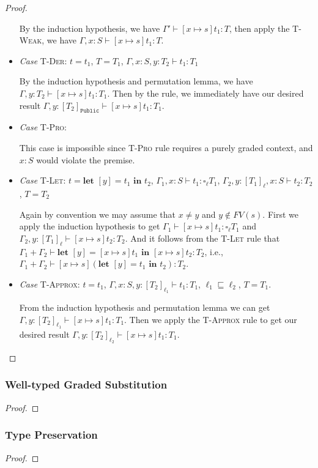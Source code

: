 \documentclass[conference]{IEEEtran}
\newcommand\unp[3]{\textbf{let }[#1]=#2\textbf{ in }#3}
\newcommand\gradedt[2]{\square_#1 #2}
\newcommand\public{\texttt{Public}}
\begin{document}
\begin{proof}
\begin{itemize}
		By the induction hypothesis, we have $\Gamma'\vdash [x\mapsto s]t_1:T$, then apply the \textsc{T-Weak}, we have $\Gamma,x:S\vdash [x\mapsto s]t_1:T$.
		
		\item\textit{Case} \textsc{T-Der}: $t=t_1$, $T=T_1$, $\Gamma,x:S,y:T_2\vdash t_1:T_1$
		
		By the induction hypothesis and permutation lemma, we have $\Gamma,y:T_2\vdash [x\mapsto s]t_1:T_1$. Then by the  rule, we immediately have our desired result $\Gamma,y:[T_2]_\public\vdash [x\mapsto s]t_1:T_1$.
		
		\item\textit{Case} \textsc{T-Pro}:
		
		This case is impossible since \textsc{T-Pro} rule requires a purely graded context, and $x:S$ would violate the premise.
		
		\item\textit{Case} \textsc{T-Let}: $t=\unp{y}{t_1}{t_2}$, $\Gamma_1,x:S\vdash t_1:\gradedt{\ell}{T_1}$, $\Gamma_2,y:[T_1]_\ell,x:S\vdash t_2:T_2$, $T=T_2$
		
		Again by convention we may assume that $x\ne y$ and $y\notin FV(s)$. First we apply the induction hypothesis to get $\Gamma_1\vdash [x\mapsto s]t_1:\gradedt{\ell}{T_1}$ and $\Gamma_2,y:[T_1]_\ell\vdash [x\mapsto s]t_2:T_2$. And it follows from the \textsc{T-Let} rule that $\Gamma_1+\Gamma_2\vdash\unp{y}{[x\mapsto s]t_1}{[x\mapsto s]t_2}:T_2$, i.e., $\Gamma_1+\Gamma_2\vdash[x\mapsto s](\unp{y}{t_1}{t_2}):T_2$.
		
		\item\textit{Case} \textsc{T-Approx}: $t=t_1$, $\Gamma,x:S,y:[T_2]_{\ell_1}\vdash t_1:T_1$, $\ell_1\sqsubseteq\ell_2$, $T=T_1$.
		
		From the induction hypothesis and permutation lemma we can get $\Gamma,y:[T_2]_{\ell_1}\vdash[x\mapsto s]t_1:T_1$. Then we apply the \textsc{T-Approx} rule to get our desired result $\Gamma,y:[T_2]_{\ell_2}\vdash[x\mapsto s]t_1:T_1$.
	\end{itemize}
\end{proof}

\subsubsection{Well-typed Graded Substitution}
\begin{proof}
	
\end{proof}

\subsubsection{Type Preservation}
\begin{proof}
	
\end{proof}
\end{document}
